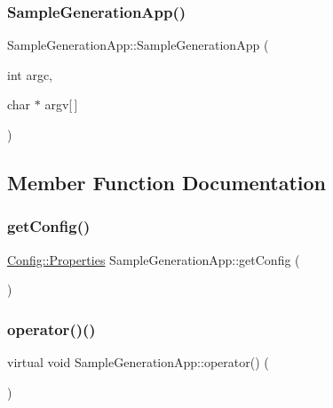 \subsubsection{\texorpdfstring{Sample\+Generation\+App()}{SampleGenerationApp()}}
{\footnotesize\ttfamily Sample\+Generation\+App\+::\+Sample\+Generation\+App (\begin{DoxyParamCaption}\item[{int}]{argc,  }\item[{char $\ast$}]{argv\mbox{[}$\,$\mbox{]} }\end{DoxyParamCaption})}



\subsection{Member Function Documentation}
\mbox{\label{class_sample_generation_app_a2c13df2c47ec917170e0b995218bb31b}} 
\subsubsection{\texorpdfstring{get\+Config()}{getConfig()}}
{\footnotesize\ttfamily \hyperlink{class_config_1_1_properties}{Config\+::\+Properties} Sample\+Generation\+App\+::get\+Config (\begin{DoxyParamCaption}{ }\end{DoxyParamCaption})}

\mbox{\label{class_sample_generation_app_a351fe6cfe624aeeee9ba4fb04d80ca0f}} 
\subsubsection{\texorpdfstring{operator()()}{operator()()}}
{\footnotesize\ttfamily virtual void Sample\+Generation\+App\+::operator() (\begin{DoxyParamCaption}{ }\end{DoxyParamCaption})\hspace{0.3cm}{\ttfamily [pure virtual]}}



